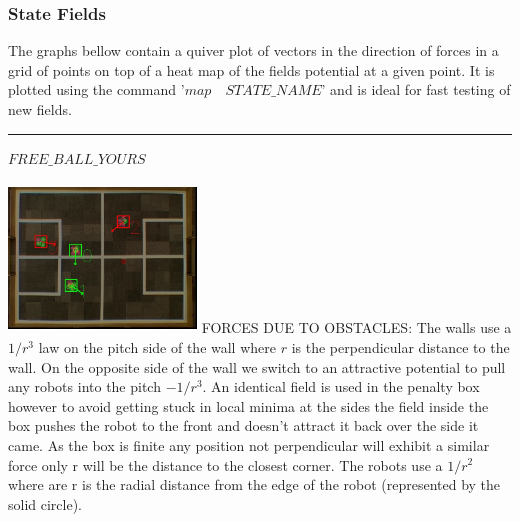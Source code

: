 \documentclass[a4paper,12pt]{article}
\begin{document}
\subsubsection{State Fields}
The graphs bellow contain a quiver plot of vectors in the direction of forces in a grid of points on top of a heat map of the fields potential at a given point. It is plotted using the command '$map\quad STATE\_NAME$' and is ideal for fast testing of new fields.\newline\newline
\rule{\textwidth}{1pt}\newline
$FREE\_BALL\_YOURS$ \newline \newline
\begin{minipage}{0.5\textwidth}\raggedright
\includegraphics[height=40mm,width=50mm]{v3.jpg}\newline\newline
FORCES DUE TO OBSTACLES:
The walls use a $1/r^3$ law on the pitch side of the wall where $r$ is the perpendicular distance to the wall. On the opposite side of the wall we switch to an attractive potential to pull any robots into the pitch $-1/r^3$. An identical field is used in the penalty box however to avoid getting stuck in local minima at the sides the field inside the box pushes the robot to the front and doesn't attract it back over the side it came. As the box is finite any position not perpendicular will exhibit a similar force only r will be the distance to the closest corner. The robots use a $1/r^2$ where are r is the radial distance from the edge of the robot (represented by the solid circle).
\end{minipage}
\hspace{.2cm}
\end{document}
